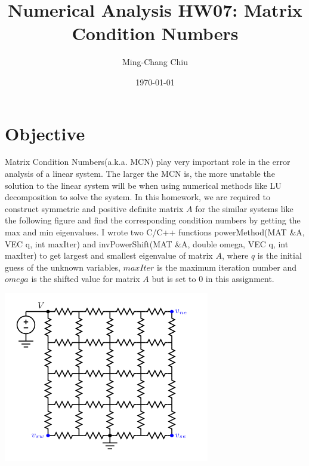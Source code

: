 \documentclass[12pt,a4paper]{article}
\title{Numerical Analysis HW07: Matrix Condition Numbers}
\author{Ming-Chang Chiu}
\date{\today}
\begin{document}
\maketitle
\fontsize{12}{20pt}\selectfont %

\section{Objective}
Matrix Condition Numbers(a.k.a. MCN) play very important role in the error analysis of a linear system. The larger the MCN is, the more unstable the solution to the linear system will be when using numerical methods like LU decomposition to solve the system. In this homework, we are required to construct symmetric and positive definite matrix $A$ for the similar systems like the following figure and find the corresponding condition numbers by getting the max and min eigenvalues. I wrote two C/C++ functions powerMethod(MAT \&A, VEC q, int maxIter) and invPowerShift(MAT \&A, double omega, VEC q, int maxIter) to get largest and smallest eigenvalue of matrix $A$, where $q$ is the initial guess of the unknown variables, $maxIter$ is the maximum iteration number and $omega$ is the shifted value for matrix $A$ but is set to $0$ in this assignment.

\includegraphics[scale =0.6 ]{./sample1.png}
\end{document}
